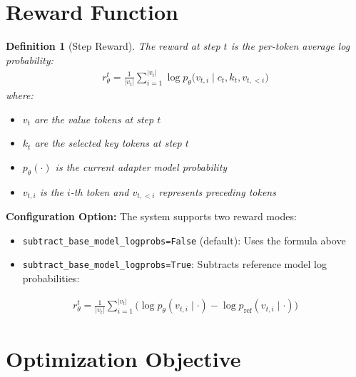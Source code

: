 \documentclass[11pt]{article}
\newtheorem{definition}{Definition}
\begin{document}
\section{Reward Function}

\begin{definition}[Step Reward]
The reward at step $t$ is the per-token average log probability:
\begin{align}
r_\theta^t = \frac{1}{|v_t|} \sum_{i=1}^{|v_t|} \log p_\theta\big(v_{t,i} \mid c_t, k_t, v_{t,<i}\big)
\end{align}
where:
\begin{itemize}
    \item $v_t$ are the value tokens at step $t$
    \item $k_t$ are the selected key tokens at step $t$
    \item $p_\theta(\cdot)$ is the current adapter model probability
    \item $v_{t,i}$ is the $i$-th token and $v_{t,<i}$ represents preceding tokens
\end{itemize}
\end{definition}

\textbf{Configuration Option:} The system supports two reward modes:
\begin{itemize}
    \item \texttt{subtract\_base\_model\_logprobs=False} (default): Uses the formula above
    \item \texttt{subtract\_base\_model\_logprobs=True}: Subtracts reference model log probabilities:
\end{itemize}

\begin{align}
r_\theta^t = \frac{1}{|v_t|} \sum_{i=1}^{|v_t|} \Big( \log p_\theta(v_{t,i} \mid \cdot) - \log p_{\text{ref}}(v_{t,i} \mid \cdot) \Big)
\end{align}



\section{Optimization Objective}
\end{document}
